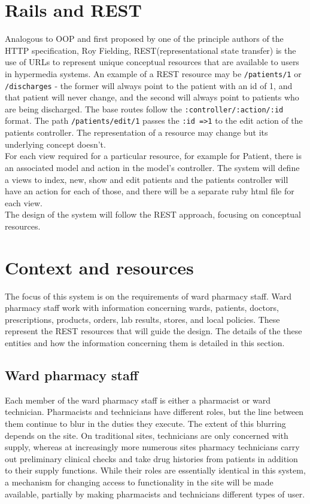 \documentclass[letterpaper]{amsart}
\begin{document}
\section{Rails and REST}
Analogous to OOP and first proposed by one of the principle authors of the HTTP specification, Roy Fielding\cite{refac}, REST(representational state transfer) is the use of URLs to represent unique conceptual resources that are available to users in hypermedia systems.    An example of a REST resource may be \texttt{/patients/1} or \texttt{/discharges} - the former will always point to the patient with an id of 1, and that patient will never change, and the second will always point to patients who are being discharged.  The base routes follow the \texttt{:controller/:action/:id} format. The path \texttt{/patients/edit/1} passes the \texttt{:id =>1} to the edit action of the patients controller.  The representation of a resource may change but its underlying concept doesn't. \\
For each view required for a particular resource, for example for Patient, there is an associated model and action in the model's controller.  The system will define a views to index, new, show and edit patients and the patients controller will have an action for each of those, and there will be a separate ruby html file for each view.\\
The design of the system will follow the REST approach, focusing on conceptual resources.  
\section{Context and resources} 
The focus of this system is on the requirements of ward pharmacy staff.  Ward pharmacy staff work with information concerning wards, patients, doctors, prescriptions, products, orders, lab results, stores, and local policies.  These represent the REST resources that will guide the design.  The details of the these entities and how the information concerning them is detailed in this section.
\subsection{Ward pharmacy staff}
Each member of the ward pharmacy staff is either a pharmacist or ward technician.  Pharmacists and technicians have different roles, but the line between them continue to blur in the duties they execute.  The extent of this blurring depends on the site.  On traditional sites, technicians are only concerned with supply, whereas at increasingly more numerous sites pharmacy technicians carry out preliminary clinical checks and take drug histories from patients in addition to their supply functions.
While their roles are essentially identical in this system, a mechanism for changing access to functionality in the site will be made available, partially by making pharmacists and technicians different types of user.
\end{document}
